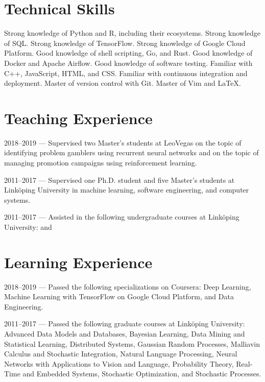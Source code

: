 \documentclass[journal]{IEEEtran}
\begin{document}
\section{Technical Skills}
Strong knowledge of Python and R, including their ecosystems. Strong knowledge
of SQL. Strong knowledge of TensorFlow. Strong knowledge of Google Cloud
Platform. Good knowledge of shell scripting, Go, and Rust. Good knowledge of
Docker and Apache Airflow. Good knowledge of software testing. Familiar with
C++, JavaScript, HTML, and CSS. Familiar with continuous integration and
deployment. Master of version control with Git. Master of Vim and LaTeX.

\section{Teaching Experience}
2018--2019 --- Supervised two Master's students at LeoVegas on the topic of
identifying problem gamblers using recurrent neural networks and on the topic
of managing promotion campaigns using reinforcement learning.

2011--2017 --- Supervised one Ph.D. student and five Master's students at
Linköping University in machine learning, software engineering, and computer
systems.

2011--2017 --- Assisted in the following undergraduate courses at Linköping
University:  
 and

\section{Learning Experience}
2018--2019 --- Passed the following specializations on Coursera: Deep Learning,
Machine Learning with TensorFlow on Google Cloud Platform, and Data Engineering.

2011--2017 --- Passed the following graduate courses at Linköping University:
Advanced Data Models and Databases, Bayesian Learning, Data Mining and
Statistical Learning, Distributed Systems, Gaussian Random Processes, Malliavin
Calculus and Stochastic Integration, Natural Language Processing, Neural
Networks with Applications to Vision and Language, Probability Theory, Real-Time
and Embedded Systems, Stochastic Optimization, and Stochastic Processes.
\end{document}
